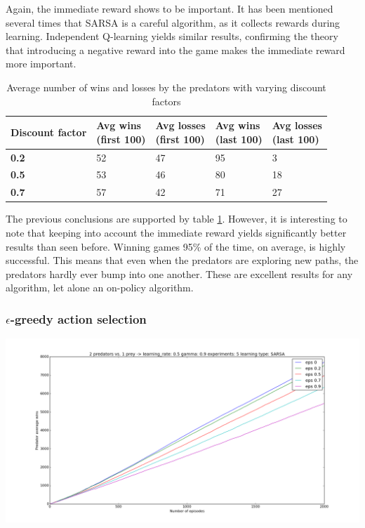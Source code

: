 Again, the immediate reward shows to be important. It has been mentioned several times that SARSA is a careful algorithm, as it collects rewards during learning. Independent Q-learning yields similar results, confirming the theory that introducing a negative reward into the game makes the immediate reward more important.

\begin{table}[H]
\begin{center}
\begin{tabular}{| l | l | l | l | l |}
\hline
\parbox{2cm}{\textbf{Discount factor}} & \parbox{2cm}{\textbf{Avg wins \\ (first 100)}} & \parbox{2cm}{\textbf{Avg losses \\ (first 100)}} & \parbox{2cm}{\textbf{Avg wins \\ (last 100)}} & \parbox{2cm}{\textbf{Avg losses \\ (last 100)}} \\
\hline
\textbf{0.2} & 52 & 47 & 95 & 3 \\
\hline
\textbf{0.5} & 53 & 46 & 80 & 18 \\
\hline
\textbf{0.7} & 57 & 42 & 71 & 27 \\
\hline
\end{tabular}
\caption{Average number of wins and losses by the predators with varying discount factors}
\label{table:SARSAdiscountfactor}
\end{center}
\end{table}

The previous conclusions are supported by table \ref{table:SARSAdiscountfactor}. However, it is interesting to note that keeping into account the immediate reward yields significantly better results than seen before. Winning games 95\% of the time, on average, is highly successful. This means that even when the predators are exploring new paths, the predators hardly ever bump into one another. These are excellent results for any algorithm, let alone an on-policy algorithm.

\subsubsection{$\epsilon$-greedy action selection}
\begin{center}
	\includegraphics[scale=0.3]{2_predators_epsilon_SARSA}
	\label{graph:SARSAgreedy}
\end{center}

